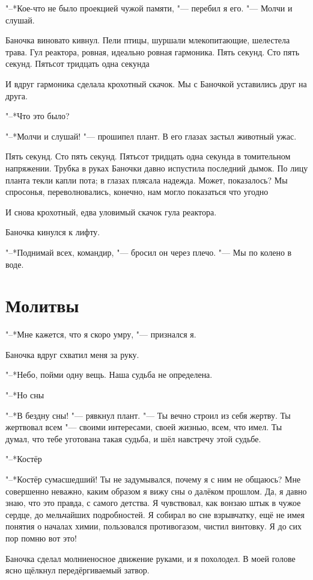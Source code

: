 \documentclass[a4paper,10pt,fleqn]{book}
\newcommand{\ldotst}{\so{...}\xspace}
\begin{document}
"--*Кое-что не было проекцией чужой памяти, "--- перебил я его.
"--- Молчи и слушай.

Баночка виновато кивнул.
Пели птицы, шуршали млекопитающие, шелестела трава.
Гул реактора, ровная, идеально ровная гармоника.
Пять секунд.
Сто пять секунд.
Пятьсот тридцать одна секунда\ldotst

И вдруг гармоника сделала крохотный скачок.
Мы с Баночкой уставились друг на друга.

"--*Что это было?

"--*Молчи и слушай! "--- прошипел плант.
В его глазах застыл животный ужас.

Пять секунд.
Сто пять секунд.
Пятьсот тридцать одна секунда в томительном напряжении.
Трубка в руках Баночки давно испустила последний дымок.
По лицу планта текли капли пота;
в глазах плясала надежда.
Может, показалось?
Мы спросонья, переволновались, конечно, нам могло показаться что угодно\ldotst

И снова крохотный, едва уловимый скачок гула реактора.

Баночка кинулся к лифту.

"--*Поднимай всех, командир, "--- бросил он через плечо.
"--- Мы по колено в воде.

\section{Молитвы}

"--*Мне кажется, что я скоро умру, "--- признался я.

Баночка вдруг схватил меня за руку.

"--*Небо, пойми одну вещь.
Наша судьба не определена.

"--*Но сны\ldotst

"--*В бездну сны! "--- рявкнул плант.
"--- Ты вечно строил из себя жертву.
Ты жертвовал всем "--- своими интересами, своей жизнью, всем, что имел.
Ты думал, что тебе уготована такая судьба, и шёл навстречу этой судьбе.

"--*Костёр\ldotst

"--*Костёр сумасшедший!
Ты не задумывался, почему я с ним не общаюсь?
Мне совершенно неважно, каким образом я вижу сны о далёком прошлом.
Да, я давно знаю, что это правда, с самого детства.
Я чувствовал, как вонзаю штык в чужое сердце, до мельчайших подробностей.
Я собирал во сне взрывчатку, ещё не имея понятия о началах химии, пользовался противогазом, чистил винтовку.
Я до сих пор помню вот это!

Баночка сделал молниеносное движение руками, и я похолодел.
В моей голове ясно щёлкнул передёргиваемый затвор.
\end{document}
